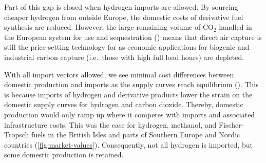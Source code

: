 
Part of this gap is closed when hydrogen imports are allowed. By sourcing
cheaper hydrogen from outside Europe, the domestic costs of derivative fuel
synthesis are reduced. However, the large remaining volume of CO$_2$ handled in
the European system for use and sequestration ()
means that direct air capture is still the price-setting technology for 
as economic applications for biogenic and industrial carbon capture (i.e.~those
with high full load hours) are depleted.


With all import vectors allowed, we see minimal cost differences between
domestic production and imports as the supply curves reach equilibrium
(). This is because imports of hydrogen and
derivative products lower the strain on the domestic supply curves for hydrogen
and carbon dioxide. Thereby, domestic production would only ramp up where it
competes with imports and associated infrastructure costs. This was the case for
hydrogen, methanol, and Fischer-Tropsch fuels in the British Isles and parts of
Southern Europe and Nordic countries (\cref{fig:market-values}). Consequently,
not all hydrogen is imported, but some domestic production is retained.

